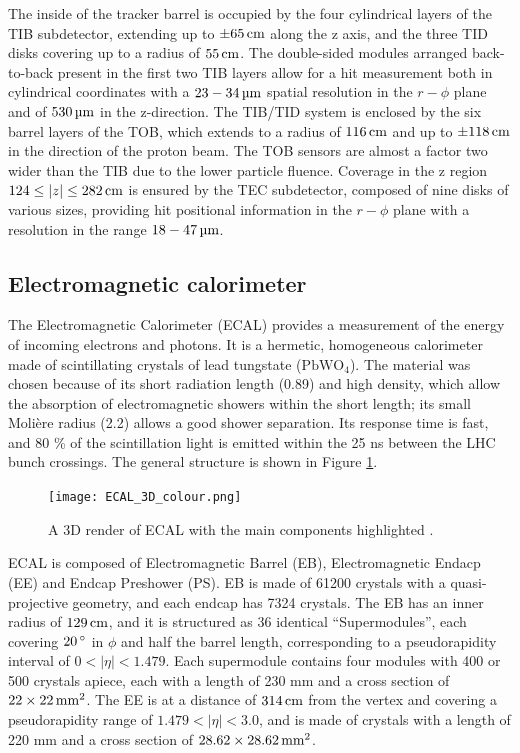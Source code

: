 The inside of the tracker barrel is occupied by the four cylindrical layers of the TIB subdetector,
extending up to $\pm 65 \,\text{cm}$ along the z axis, and the three TID disks covering up to a radius of $55 \,\text{cm}$.
The double-sided modules arranged back-to-back present in the first two TIB layers allow for a hit measurement both in cylindrical coordinates
with a $23-34 \mum$ spatial resolution in the $r - \phi$ plane and of $530 \mum$ in the z-direction.
The TIB/TID system is enclosed by the six barrel layers of the TOB, which extends to a radius of $116 \,\text{cm}$ and up to $\pm 118 \,\text{cm}$ in the direction of the proton beam.
The TOB sensors are almost a factor two wider than the TIB due to the lower particle fluence.
Coverage in the z region $124 \le |z| \le 282 \,\text{cm}$ is ensured by the TEC subdetector, composed of nine disks of various sizes,
providing hit positional information in the $r - \phi$ plane with a resolution in the range $18 - 47 \mum$.

\subsection{Electromagnetic calorimeter}
The Electromagnetic Calorimeter (ECAL) \cite{CERN-LHCC-97-033} provides a measurement of the energy of incoming electrons and photons.
It is a hermetic, homogeneous calorimeter made of scintillating crystals of lead tungstate ($\mathrm{PbWO_4}$).
The material was chosen because of its short radiation length (0.89\cm) and high density,
which allow the absorption of electromagnetic showers within the short length;
its small Moli\`ere radius (2.2\cm) allows a good shower separation.
Its response time is fast, and 80 \% of the scintillation light is emitted within the 25 ns between the LHC bunch crossings.
The general structure is shown in Figure \ref{fig:ECAL_3D_colour}.

\begin{figure}[thb]
  \centering
  \texttt{[image: ECAL\_3D\_colour.png]}
  \caption{A 3D render of ECAL with the main components highlighted \cite{siddireddy2018cms}.}
  \label{fig:ECAL_3D_colour}
\end{figure}

ECAL is composed of Electromagnetic Barrel (EB), Electromagnetic Endacp (EE) and Endcap Preshower (PS).
EB is made of 61200 crystals with a quasi-projective geometry, and each endcap has 7324 crystals.
The EB has an inner radius of $129 \,\text{cm}$, and it is structured as 36 identical ``Supermodules'',
each covering $20\usep ^{\circ}$ in $\phi$ and half the barrel length, corresponding to a pseudorapidity interval of $0 < |\eta| < 1.479$.
Each supermodule contains four modules with 400 or 500 crystals apiece, each with a length of 230 mm and a cross section of $22 \times 22 \usep \mathrm{mm}^2$.
The EE is at a distance of $314 \,\text{cm}$ from the vertex and covering a pseudorapidity range of $1.479 < |\eta| < 3.0$,
and is made of crystals with a length of 220 mm and a cross section of $28.62 \times 28.62 \usep \mathrm{mm}^2$.

